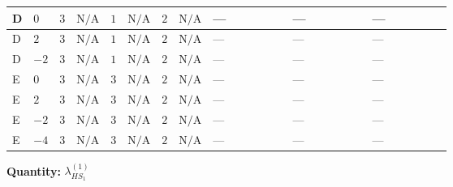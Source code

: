 \documentclass[8pt]{article}
\begin{document}
\begin{landscape}
\begin{longtable}{@{}llcccccc >{\raggedright\arraybackslash}p{0.21\linewidth} >{\raggedright\arraybackslash}p{0.21\linewidth} >{\raggedright\arraybackslash}p{0.21\linewidth}@{}}
\midrule
D & $0$ & $3$ & $\text{N/A}$ & $1$ & $\text{N/A}$ & $2$ & $\text{N/A}$ & --- & --- & --- \\
\midrule
D & $2$ & $3$ & $\text{N/A}$ & $1$ & $\text{N/A}$ & $2$ & $\text{N/A}$ & --- & --- & --- \\
\midrule
D & $-2$ & $3$ & $\text{N/A}$ & $1$ & $\text{N/A}$ & $2$ & $\text{N/A}$ & --- & --- & --- \\
\midrule
E & $0$ & $3$ & $\text{N/A}$ & $3$ & $\text{N/A}$ & $2$ & $\text{N/A}$ & --- & --- & --- \\
\midrule
E & $2$ & $3$ & $\text{N/A}$ & $3$ & $\text{N/A}$ & $2$ & $\text{N/A}$ & --- & --- & --- \\
\midrule
E & $-2$ & $3$ & $\text{N/A}$ & $3$ & $\text{N/A}$ & $2$ & $\text{N/A}$ & --- & --- & --- \\
\midrule
E & $-4$ & $3$ & $\text{N/A}$ & $3$ & $\text{N/A}$ & $2$ & $\text{N/A}$ & --- & --- & --- \\
\midrule
\bottomrule
\end{longtable}
\clearpage
\noindent\textbf{Quantity: }$\lambda_{HS_1}^{(1)}$\par\smallskip

\end{landscape}
\end{document}
